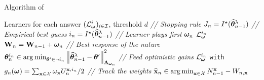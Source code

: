 \begin{algorithm}[ht]
\centering
\caption{Algorithm of \LG{}}
\label{alg:lg}
\begin{algorithmic}[1]
     Learners for each answer $(\mathcal{L}^i_{\boldsymbol \omega})_{i\in\mathcal{I}}$, threshold $d$
        \State \textit{// Stopping rule}
            \State {} 
             $J_n = I^\star(\widehat{{\boldsymbol \theta}}_{n-1}^\lambda)$
        \EndIf
        \State \textit{// Empirical best guess}
        \State $i_n = I^\star(\widehat{{\boldsymbol \theta}}_{n-1}^\lambda)$
        \State \textit{// Learner plays first}
        \State {} ${\boldsymbol \omega}_n$  $\mathcal{L}^{i_n}_{\boldsymbol \omega}$
        \State {} ${\bf W}_n={\bf W}_{n-1}+{\boldsymbol \omega}_n$
        \State \textit{// Best response of the nature}
        \State ${\boldsymbol \theta}_n^{i_n} \in \operatorname*{arg\,min}_{{\boldsymbol \theta}'\in\neg i_n}\left\lVert\widehat{{\boldsymbol \theta}}_{n-1}^\lambda-{\boldsymbol \theta}'\right\rVert^2_{{\boldsymbol \Lambda}_{{\boldsymbol \omega}_n}}$
        \State \textit{// Feed optimistic gains}
        \State {} $\mathcal{L}_{\boldsymbol \omega}^{i_n}$ \texttt{with} $g_{n}({\boldsymbol \omega}) = \sum_{{\bf x}\in\mathcal{X}}\omega_{\bf x} U_n^{{\bf x},i_n}/2$
        \State \textit{// Track the weights}
        \State {} $\widehat{{\bf x}}_n \in \operatorname*{arg\,min}_{{\bf x}\in \mathcal{X}} N_{n-1}^{{\bf x}} - W_{n,{\bf x}}$
   \EndFor
\end{algorithmic}
\end{algorithm}


